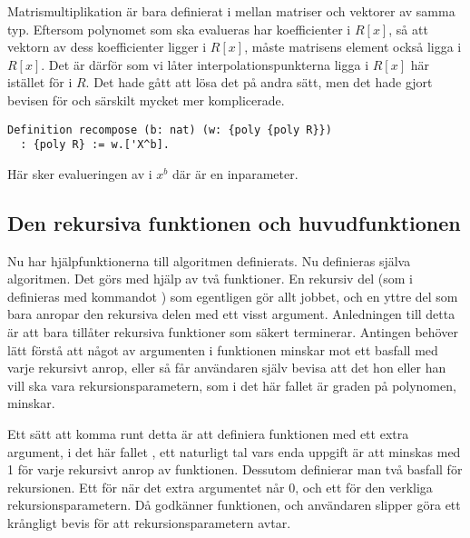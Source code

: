 Matrismultiplikation är bara definierat i \ssr{} mellan matriser och vektorer av
samma typ. Eftersom polynomet  som ska evalueras har koefficienter i
$R[x]$, så att vektorn av dess koefficienter ligger i $R[x]$, måste matrisens
element också ligga i $R[x]$. Det är därför som vi låter
interpolationspunkterna ligga i $R[x]$ här istället för i $R$. Det hade gått
att lösa det på andra sätt, men det hade gjort bevisen för  och
särskilt  mycket mer komplicerade.

\begin{lstlisting}
Definition recompose (b: nat) (w: {poly {poly R}})
  : {poly R} := w.['X^b].
\end{lstlisting}
Här sker evalueringen av  i $x^b$ där  är en inparameter.

\subsection{Den rekursiva funktionen och huvudfunktionen}
\label{sec:formrec}

Nu har hjälpfunktionerna till algoritmen definierats. Nu definieras själva
algoritmen. Det görs med hjälp av två funktioner. En rekursiv del (som i \coq{}
definieras med kommandot ) som egentligen gör allt jobbet, och en
yttre del som bara anropar den rekursiva delen med ett visst argument.
Anledningen till detta är att \coq{} bara tillåter rekursiva funktioner som
säkert terminerar. Antingen behöver \coq{} lätt förstå att något av argumenten
i funktionen minskar mot ett basfall med varje rekursivt anrop, eller så får
användaren själv bevisa att det hon eller han vill ska vara
rekursionsparametern, som i det här fallet är graden på polynomen, minskar.

Ett sätt att komma runt detta är att definiera funktionen med ett extra
argument, i det här fallet , ett naturligt tal vars enda uppgift är att
minskas med 1 för varje rekursivt anrop av funktionen. Dessutom definierar man
två basfall för rekursionen. Ett för när det extra argumentet  når 0,
och ett för den verkliga rekursionsparametern. Då godkänner \coq{} funktionen,
och användaren slipper göra ett krångligt bevis för att rekursionsparametern
avtar.

